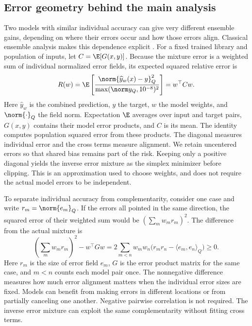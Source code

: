 \subsection{Error geometry behind the main analysis}
\label{app:geometry}
Two models with similar individual accuracy can give very different ensemble
gains, depending on where their errors occur and how those errors align.
Classical ensemble analysis makes this dependence explicit
\citep{breiman1996,krogh1994}. For a fixed trained library and population of
inputs, let $C=\E[G(x,y)]$. Because the mixture error is a weighted sum of
individual normalized error fields, its expected squared relative error is
\begin{equation}
 R(w)=\E\left[\frac{\norm{\widehat y_w(x)-y}_Q^2}{\max(\norm y_Q,10^{-8})^2}\right]
 =w^\top Cw.
\label{eq:risk}
\end{equation}
Here $\widehat y_w$ is the combined prediction, $y$ the target, $w$ the model
weights, and $\norm{\cdot}_Q$ the field norm. Expectation $\E$ averages over
input and target pairs, $G(x,y)$ contains their model error products, and $C$
is its mean. The identity computes population squared error from these products.
The diagonal measures individual error and the cross terms measure alignment.
We retain uncentered errors so that shared bias remains part of the risk.
Keeping only a positive diagonal yields the inverse error mixture as the simplex
minimizer before clipping. This is an approximation used to choose weights,
and does not require the actual model errors to be independent.

To separate individual accuracy from complementarity, consider one case and write $r_m=\norm{e_m}_Q$.
If the errors all pointed in the same direction, the squared error of their
weighted sum would be $(\sum_m w_m r_m)^2$.
The difference from the actual mixture is
\begin{equation}
 \left(\sum_m w_m r_m\right)^2-w^\top Gw
 =2\sum_{m<n}w_mw_n\bigl(r_mr_n-\langle e_m,e_n\rangle_Q\bigr)\geq0.
\label{eq:direction}
\end{equation}
Here $r_m$ is the size of error field $e_m$, $G$ is the error product matrix for
the same case, and $m<n$ counts each model pair once. The nonnegative difference
measures how much error alignment matters when the individual error sizes are fixed.
Models can benefit from making errors in different locations or from partially
canceling one another. Negative pairwise correlation is not required.
The inverse error mixture can exploit the same complementarity without fitting cross terms.

